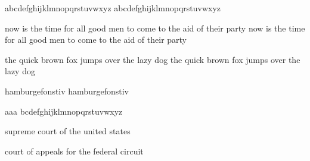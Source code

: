 \documentclass[12pt]{article}
\begin{document}
\Huge
abcdefghijklmnopqrstuvwxyz
\textsf{abcdefghijklmnopqrstuvwxyz}

now is the time for all good men to come to the aid of their party
\textsf{now is the time for all good men to come to the aid of their party}

the quick brown fox jumps over the lazy dog
\textsf{the quick brown fox jumps over the lazy dog}

hamburgefonstiv
\textsf{hamburgefonstiv}

\def\doletter#1{\ifx#1\relax\else #1\textsf{#1} \expandafter\doletter\fi}

\doletter abcdefghijklmnopqrstuvwxyz\relax

supreme court of the united states

court of appeals for the federal circuit
\end{document}
